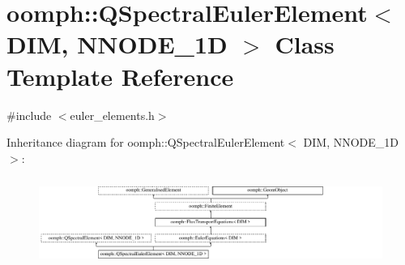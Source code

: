 \hypertarget{classoomph_1_1QSpectralEulerElement}{}\section{oomph\+:\+:Q\+Spectral\+Euler\+Element$<$ D\+IM, N\+N\+O\+D\+E\+\_\+1D $>$ Class Template Reference}
\label{classoomph_1_1QSpectralEulerElement}


{\ttfamily \#include $<$euler\+\_\+elements.\+h$>$}

Inheritance diagram for oomph\+:\+:Q\+Spectral\+Euler\+Element$<$ D\+IM, N\+N\+O\+D\+E\+\_\+1D $>$\+:\begin{figure}[H]
\begin{center}
\leavevmode
\includegraphics[height=2.935010cm]{classoomph_1_1QSpectralEulerElement}
\end{center}
\end{figure}
